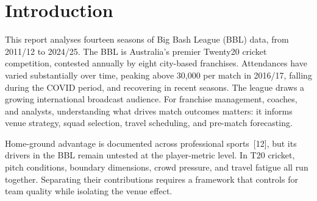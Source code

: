 \documentclass[12pt,a4paper]{article}
\begin{document}
\newpage
\begin{abstract}
\noindent
This report extends Project~A's analysis of home-ground advantage in the Big Bash League
(BBL) with a rebuilt modelling framework. The dataset uses \textbf{two rows per match}, one
per team, per the instructor's specification, with \texttt{match\_id} as a random intercept
to handle within-match correlation. Feature engineering uses strictly historical, lag-based
metrics; bowling team attribution and batting average are recomputed from scratch. Five
models are fitted and compared: a baseline logistic regression on home status only~(M1), a
full logistic regression on ten predictors~(M2), a LASSO interaction model~(M3), a Bayesian
GLMM~(M4), and \texttt{lme4}'s \texttt{glmer} via \texttt{rpy2}~(M5). Home-ground status is
a statistically significant predictor in isolation (M1:~OR\,=\,1.36, $p = 0.008$) and after
controlling for all predictors (M2:~OR\,=\,1.39, $p = 0.005$; M5:~OR\,=\,1.40,
$p = 0.004$). Recent form and head-to-head win rate are also significant. Familiarity metrics
drop out once the leakage correction is applied. A parallel extended analysis tests toss
outcomes, first-innings scoring, season trends, franchise effects, DRS umpiring, home bowling
defence, and first-six-over performance.
\end{abstract}

\newpage
\tableofcontents
\newpage

\section{Introduction}

This report analyses fourteen seasons of Big Bash League (BBL) data, from 2011/12 to
2024/25. The BBL is Australia's premier Twenty20 cricket competition, contested annually
by eight city-based franchises. Attendances have varied substantially over time, peaking
above 30,000 per match in 2016/17, falling during the COVID period, and recovering in
recent seasons. The league draws a growing international broadcast audience. For franchise
management, coaches, and analysts, understanding what drives match outcomes matters: it informs venue strategy, squad selection,
travel scheduling, and pre-match forecasting.

Home-ground advantage is documented across professional sports~[12], but its drivers in the
BBL remain untested at the player-metric level. In T20 cricket, pitch conditions, boundary
dimensions, crowd pressure, and travel fatigue all run together. Separating their contributions requires a framework that controls for team quality while
isolating the venue effect.
\end{document}
